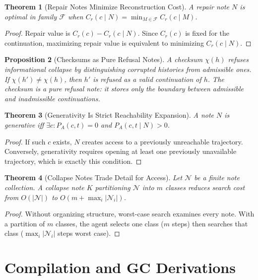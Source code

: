 \documentclass[12pt, a4paper, openany]{book}
\theoremstyle{plain}
\newtheorem{theorem}{Theorem}[chapter]
\newtheorem{proposition}[theorem]{Proposition}
\theoremstyle{definition}
\theoremstyle{remark}
\newcommand{\calN}{\mathcal{N}}
\begin{document}
\begin{theorem}[Repair Notes Minimize Reconstruction Cost]
A repair note $N$ is optimal in family $\mathcal{F}$ when
$C_r(c \mid N) = \min_{M \in \mathcal{F}} C_r(c \mid M)$.
\end{theorem}

\begin{proof}
Repair value is $C_r(c) - C_r(c \mid N)$. Since $C_r(c)$ is fixed for the
continuation, maximizing repair value is equivalent to minimizing $C_r(c \mid N)$.
\end{proof}

\begin{proposition}[Checksums as Pure Refusal Notes]
A checksum $\chi(h)$ refuses informational collapse by distinguishing corrupted
histories from admissible ones. If $\chi(h') \neq \chi(h)$, then $h'$ is refused
as a valid continuation of $h$. The checksum is a pure refusal note: it stores
only the boundary between admissible and inadmissible continuations.
\end{proposition}

\begin{theorem}[Generativity Is Strict Reachability Expansion]
A note $N$ is generative iff $\exists c : P_A(c,t) = 0$ and $P_A(c,t \mid N) > 0$.
\end{theorem}

\begin{proof}
If such $c$ exists, $N$ creates access to a previously unreachable trajectory.
Conversely, generativity requires opening at least one previously unavailable
trajectory, which is exactly this condition.
\end{proof}

\begin{theorem}[Collapse Notes Trade Detail for Access]
Let $\calN$ be a finite note collection. A collapse note $K$ partitioning $\calN$
into $m$ classes reduces search cost from $O(|\calN|)$ to $O(m + \max_i |\calN_i|)$.
\end{theorem}

\begin{proof}
Without organizing structure, worst-case search examines every note. With a
partition of $m$ classes, the agent selects one class ($m$ steps) then searches
that class ($\max_i |\calN_i|$ steps worst case).
\end{proof}

\section{Compilation and GC Derivations}
\end{document}
